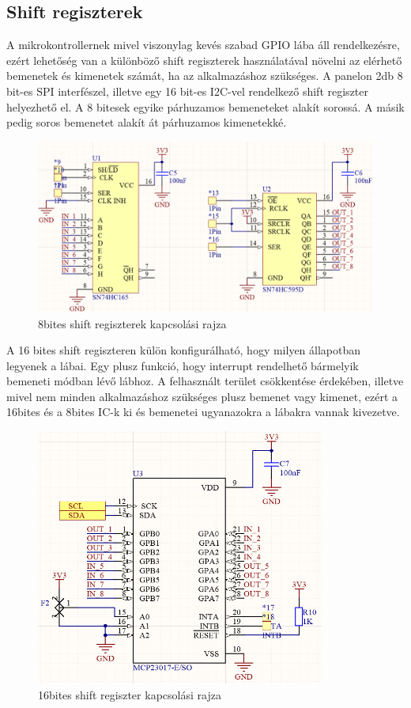 \subsection{Shift regiszterek}
A mikrokontrollernek mivel viszonylag kevés szabad GPIO lába áll rendelkezésre, ezért lehetőség van a különböző shift regiszterek használatával növelni az elérhető bemenetek és kimenetek számát, ha az alkalmazáshoz szükséges. A panelon 2db 8 bit-es SPI interfészel, illetve egy 16 bit-es I2C-vel rendelkező shift regiszter helyezhető el. A 8 bitesek egyike párhuzamos bemeneteket alakít sorossá. A másik pedig soros bemenetet alakít át párhuzamos kimenetekké. 
\begin{figure}[!ht]
    \centering
    \includegraphics[width=140mm, keepaspectratio]{figures/8bit_shift_registers.png}
    \caption{8bites shift regiszterek kapcsolási rajza}
    \label{fig:shift_register}
\end{figure}
A 16 bites shift regiszteren külön konfigurálható, hogy milyen állapotban legyenek a lábai. Egy plusz funkció, hogy interrupt rendelhető bármelyik bemeneti módban lévő lábhoz. A felhasznált terület csökkentése érdekében, illetve mivel nem minden alkalmazáshoz szükséges plusz bemenet vagy kimenet, ezért a 16bites és a 8bites IC-k ki és bemenetei ugyanazokra a lábakra vannak kivezetve.
\begin{figure}[!ht]
    \centering
    \includegraphics[width=95mm, keepaspectratio]{figures/16bit_shift_register.png}
    \caption{16bites shift regiszter kapcsolási rajza}
    \label{fig:shift_register}
\end{figure}


